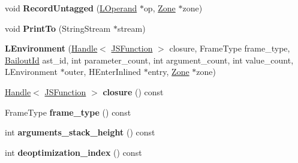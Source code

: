 \begin{DoxyCompactItemize}
\item 
\hypertarget{classv8_1_1internal_1_1_v8___f_i_n_a_l_a2594f958ae1df84457856241c0d181f0}{}void {\bfseries Record\+Untagged} (\hyperlink{classv8_1_1internal_1_1_l_operand}{L\+Operand} $\ast$op, \hyperlink{classv8_1_1internal_1_1_zone}{Zone} $\ast$zone)\label{classv8_1_1internal_1_1_v8___f_i_n_a_l_a2594f958ae1df84457856241c0d181f0}

\item 
\hypertarget{classv8_1_1internal_1_1_v8___f_i_n_a_l_aac605080a924e4a0fbe764c5a5d1c39d}{}void {\bfseries Print\+To} (String\+Stream $\ast$stream)\label{classv8_1_1internal_1_1_v8___f_i_n_a_l_aac605080a924e4a0fbe764c5a5d1c39d}

\item 
\hypertarget{classv8_1_1internal_1_1_v8___f_i_n_a_l_aa510541c739f53d7ad01e952953bc073}{}{\bfseries L\+Environment} (\hyperlink{classv8_1_1internal_1_1_handle}{Handle}$<$ \hyperlink{classv8_1_1internal_1_1_j_s_function}{J\+S\+Function} $>$ closure, Frame\+Type frame\+\_\+type, \hyperlink{classv8_1_1internal_1_1_bailout_id}{Bailout\+Id} ast\+\_\+id, int parameter\+\_\+count, int argument\+\_\+count, int value\+\_\+count, L\+Environment $\ast$outer, H\+Enter\+Inlined $\ast$entry, \hyperlink{classv8_1_1internal_1_1_zone}{Zone} $\ast$zone)\label{classv8_1_1internal_1_1_v8___f_i_n_a_l_aa510541c739f53d7ad01e952953bc073}

\item 
\hypertarget{classv8_1_1internal_1_1_v8___f_i_n_a_l_ade63ed30b870bf27f384fe16a3aad9fa}{}\hyperlink{classv8_1_1internal_1_1_handle}{Handle}$<$ \hyperlink{classv8_1_1internal_1_1_j_s_function}{J\+S\+Function} $>$ {\bfseries closure} () const \label{classv8_1_1internal_1_1_v8___f_i_n_a_l_ade63ed30b870bf27f384fe16a3aad9fa}

\item 
\hypertarget{classv8_1_1internal_1_1_v8___f_i_n_a_l_a0f226b1114fb03022d6ab41e3f75dafd}{}Frame\+Type {\bfseries frame\+\_\+type} () const \label{classv8_1_1internal_1_1_v8___f_i_n_a_l_a0f226b1114fb03022d6ab41e3f75dafd}

\item 
\hypertarget{classv8_1_1internal_1_1_v8___f_i_n_a_l_a76f4b9227a1f7ee9d00ced030d1a339e}{}int {\bfseries arguments\+\_\+stack\+\_\+height} () const \label{classv8_1_1internal_1_1_v8___f_i_n_a_l_a76f4b9227a1f7ee9d00ced030d1a339e}

\item 
\hypertarget{classv8_1_1internal_1_1_v8___f_i_n_a_l_a2b531b6e27c4346bbe80a90e249792e3}{}int {\bfseries deoptimization\+\_\+index} () const \label{classv8_1_1internal_1_1_v8___f_i_n_a_l_a2b531b6e27c4346bbe80a90e249792e3}


\end{DoxyCompactItemize}
